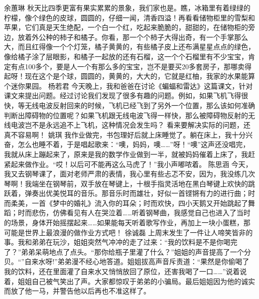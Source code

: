 \markdownRendererInterblockSeparator
{}\markdownRendererInterblockSeparator
{}余蕙琳\markdownRendererInterblockSeparator
{}秋天比四季更富有果实累累的景象，我们家也是。瞧，冰箱里有着绿绿的柠檬，像个绿色的皮球，圆圆的，仔细一闻，清香四溢！再看看储物柜里的雪梨和苹果，它们真是天生绝配，一个白一个红，吃起来脆脆的，甜甜的，在储物柜的旁边，放着外公种的柿子和橘子。你看，那一个个柿子大得出奇，有一个手掌那么大，而且红得像一个个灯笼，橘子黄黄的，有些橘子皮上还布满星星点点的绿色，像给橘子涂了层眼影，和橘子一起放的还有石榴，这一个个石榴里有不少宝宝，肯定有点100多个，要是人一个有那么多的宝宝，岂不是要买20多套房子，那哪卖得起呀！现在这个是个球，圆圆的，黄黄的，大大的，它就是红柚，我家的水果能算个迷你果园。\markdownRendererInterblockSeparator
{}\markdownRendererInterblockSeparator
{}杨若君\markdownRendererInterblockSeparator
{}今天晚上，我和爸爸在讨论《蝙蝠和雷达》这篇课文，针对课文来提出问题。经过讨论我们发现了很多有趣的问题。例如，如果飞机飞得很快，等无线电波反射回来的时候，飞机已经飞到了另外一个位置，那么该如何准确判断出障碍物的位置呢？如果飞机跟无线电波飞得一样快，那么被障碍物反射的无线电波岂不是永远追不上飞机，这种情况会发生吗？\markdownRendererInterblockSeparator
{}看来要解决实际的问题，还真不容易啊！\markdownRendererInterblockSeparator
{}\markdownRendererInterblockSeparator
{}姚琪\markdownRendererInterblockSeparator
{}我作业做完，书包理好后就上床睡觉了。躺在床上，我十分兴奋，怎么也睡不着，于是唱起歌来：“噢，妈妈，噢……”呀！“噢”这声还没唱完，我就从床上蹦起来了，原来是我的数学作业做到一半，就被妈妈催着上床了，我赶紧起来做作业。“哎！以后可不能再这么马虎了！”我小声嘟哝着。\markdownRendererInterblockSeparator
{}\markdownRendererInterblockSeparator
{}陈思涵\markdownRendererInterblockSeparator
{}今天，我又去钢琴课了，面对老师严肃的表情，我心里有些忐忑不安，因为，我没练几次琴啊！我端坐在钢琴前，双手放在琴键上，十根手指灵活地在黑白琴键上欢快的跳跃着，弹奏出优美悦耳的音乐。那音乐时而雄壮，好似一首铿锵有力的进行曲；时而柔美，一首《梦中的婚礼》流入你的耳朵；时而欢快，四小天鹅又开始跳起了舞蹈；时而悲伤，仿佛看见有人在哭泣着……听着钢琴曲，我感觉自己也进入了当时的场景，身体开始摇摆起来……如果能每天听着歌写作业，再加上一块小蛋糕，那可能是世界上最浪漫的做作业方式吧！\markdownRendererInterblockSeparator
{}\markdownRendererInterblockSeparator
{}徐诚磊\markdownRendererInterblockSeparator
{}上周末发生了一件让人啼笑皆非的事。我和弟弟在玩沙，姐姐突然气冲冲的走了过来：“我的饮料是不是你喝完了？”弟弟呆萌地点了点头。“那你给瓶子里灌了什么？”姐姐的声音提高了一个分贝。“”自来水呀!”弟弟漫不经心地答道。姐姐拔高声音斥责道：“果然是你偷喝了我的饮料，还在里面灌了自来水又悄悄放回了原位，还害我喝了一口……”说着说着，姐姐自己被气笑出了声。大家都惊叹于弟弟的小骗局。最后姐姐因为他的诚实而放了他一马，并警告他以后再也不准这样了。\markdownRendererInterblockSeparator
